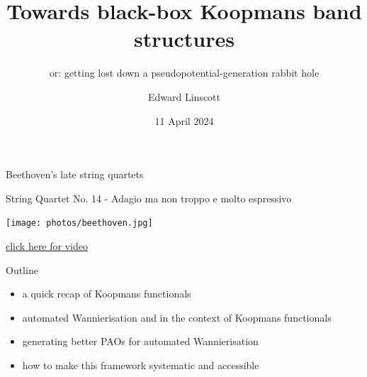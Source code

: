 \documentclass[xcolor=table,aspectratio=169]{beamer}
\author{Edward Linscott}
\institute{PSI}
\date{11 April 2024}
\title{Towards black-box Koopmans band structures}
\subtitle{or: getting lost down a pseudopotential-generation rabbit hole}
\numberwithin{equation}{section}
\begin{document}
\begin{frame}{Beethoven's late string quartets}
   \centering

   String Quartet No. 14 - Adagio ma non troppo e molto espressivo

   \vspace{6pt}

   \texttt{[image: photos/beethoven.jpg]}

   {\tiny \href{https://www.youtube.com/watch?v=JE_crvhG3Co\&t=454s\&ab_channel=DavidSukonick\#t=4m27s}{click here for video}}



\end{frame}

\frame{\titlepage}

\begin{frame}{Outline}
   \begin{itemize}
      \item a quick recap of Koopmans functionals
      \item automated Wannierisation and in the context of Koopmans functionals
      \item generating better PAOs for automated Wannierisation
      \item how to make this framework systematic and accessible
   \end{itemize}
\end{frame}
\end{document}
